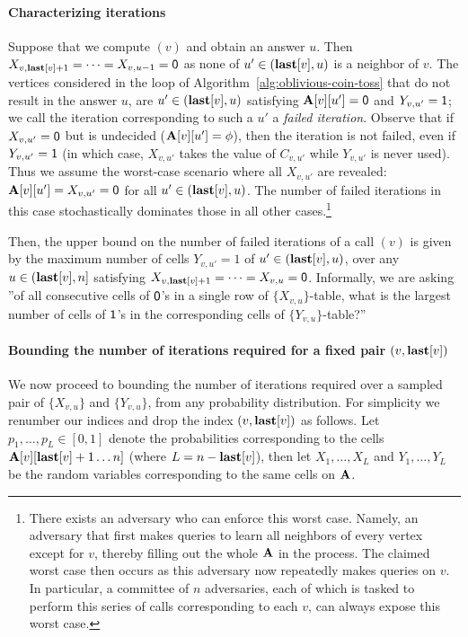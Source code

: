 \paragraph*{Characterizing iterations}
Suppose that we compute $(v)$ and obtain an answer $u$. Then $X_{v,\mathbf{last}[v]+1} = \cdots = X_{v, u-1} = \mathsf{0}$ as none of $u' \in (\mathbf{last}[v], u)$ is a neighbor of $v$. The vertices considered in the loop of Algorithm~\ref{alg:oblivious-coin-toss} that do not result in the answer $u$, are $u' \in (\mathbf{last}[v], u)$ satisfying $\mathbf{A}[v][u'] = \mathsf{0}$ and $Y_{v,u'} = \mathsf{1}$; we call the iteration corresponding to such a $u'$ a \emph{failed iteration}. Observe that if $X_{v,u'} = \mathsf{0}$ but is undecided ($\mathbf{A}[v][u'] = \phi$), then the iteration is not failed, even if $Y_{v,u'} = \mathsf{1}$ {\color{red}(in which case, $X_{v,u'}$ takes the value of $C_{v,u'}$ while $Y_{v,u'}$ is never used)}. Thus we assume the worst-case scenario where all $X_{v,u'}$ are revealed: $\mathbf{A}[v][u']=X_{v,u'}=\mathsf{0}$ for all $u'\in(\mathbf{last}[v], u)$. The number of failed iterations in this case stochastically dominates those in all other cases.\footnote{There exists an adversary who can enforce this worst case. Namely, an adversary that first makes  queries to learn all neighbors of every vertex except for $v$, thereby filling out the whole $\mathbf{A}$ in the process. The claimed worst case then occurs as this adversary now repeatedly makes  queries on $v$. In particular, a committee of $n$ adversaries, each of which is tasked to perform this series of calls corresponding to each $v$, can always expose this worst case.}

Then, the upper bound on the number of failed iterations of a call $(v)$ is given by the maximum number of cells $Y_{v, u'} = 1$ of $u' \in(\mathbf{last}[v], u)$, over any $u \in(\mathbf{last}[v], n]$ satisfying $X_{v,\mathbf{last}[v]+1} = \cdots = X_{v,u} = \mathsf{0}$. Informally, we are asking ''of all consecutive cells of $\mathsf{0}$'s in a single row of $\{X_{v,u}\}$-table, what is the largest number of cells of $\mathsf{1}$'s in the corresponding cells of $\{Y_{v,u}\}$-table?''

\paragraph*{Bounding the number of iterations required for a fixed pair $(v, \mathbf{last}[v])$}
We now proceed to bounding the number of iterations required over a sampled pair of $\{X_{v,u}\}$ and $\{Y_{v,u}\}$, from any probability distribution. For simplicity we renumber our indices and drop the index $(v,\mathbf{last}[v])$ as follows. Let $p_1, \ldots, p_L \in [0, 1]$ denote the probabilities corresponding to the cells $\mathbf{A}[v][\mathbf{last}[v]+1 \ldots n]$ (where $L = n-\mathbf{last}[v]$), then let $X_1, \ldots, X_L$ and $Y_1, \ldots, Y_L$ be the random variables corresponding to the same cells on $\mathbf{A}$.

